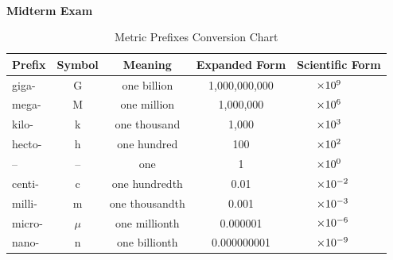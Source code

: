 

\addpoints
\noprintanswers




\begin{centering}
\noindent\textbf{\\\Large Midterm Exam\\} 
\end{centering}

\qsp
{}
\qsp


\begin{table}[h!]
\centering

\begin{tabular}{l c c c l}
\toprule
\textbf{Prefix} & \textbf{Symbol} & \textbf{Meaning} & \textbf{Expanded Form} & \textbf{Scientific Form}\\
\midrule
giga- & G & one billion & 1,000,000,000 & $\hspace{4ex}\times 10^{9}$\\ 
mega- & M & one million & 1,000,000 & $\hspace{4ex}\times 10^{6}$\\ 
kilo- & k & one thousand & 1,000 & $\hspace{4ex}\times 10^{3}$\\ 
hecto- & h & one hundred & 100 & $\hspace{4ex}\times 10^{2}$\\ 
-- & -- & one & 1 & $\hspace{4ex}\times 10^{0}$\\ 
centi- & c & one hundredth & 0.01 & $\hspace{4ex}\times 10^{-2}$\\ 
milli- & m & one thousandth & 0.001 & $\hspace{4ex}\times 10^{-3}$\\ 
micro- & $\mu$ & one millionth & 0.000001 & $\hspace{4ex}\times 10^{-6}$\\ 
nano- & n & one billionth & 0.000000001 & $\hspace{4ex}\times 10^{-9}$\\ 
\bottomrule
\end{tabular}
\captionsetup{font=small, labelfont=bf}
\caption{Metric Prefixes Conversion Chart}
\end{table}

